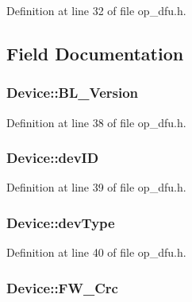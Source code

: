 Definition at line 32 of file op\-\_\-dfu.\-h.



\subsection{Field Documentation}
\hypertarget{struct_device_ae487fa50d1de851605401068ef8730fb}{
\subsubsection[{B\-L\-\_\-\-Version}]{ Device\-::\-B\-L\-\_\-\-Version}}\label{struct_device_ae487fa50d1de851605401068ef8730fb}


Definition at line 38 of file op\-\_\-dfu.\-h.

\hypertarget{struct_device_ac279d7f2e95b5ea61c2838cace97e0f3}{
\subsubsection[{dev\-I\-D}]{ Device\-::dev\-I\-D}}\label{struct_device_ac279d7f2e95b5ea61c2838cace97e0f3}


Definition at line 39 of file op\-\_\-dfu.\-h.

\hypertarget{struct_device_a94b1db8f05f4e21fc5f00333a46c2352}{
\subsubsection[{dev\-Type}]{ Device\-::dev\-Type}}\label{struct_device_a94b1db8f05f4e21fc5f00333a46c2352}


Definition at line 40 of file op\-\_\-dfu.\-h.

\hypertarget{struct_device_a676a5d429497021b5ad095b527f935cc}{
\subsubsection[{F\-W\-\_\-\-Crc}]{ Device\-::\-F\-W\-\_\-\-Crc}}\label{struct_device_a676a5d429497021b5ad095b527f935cc}


